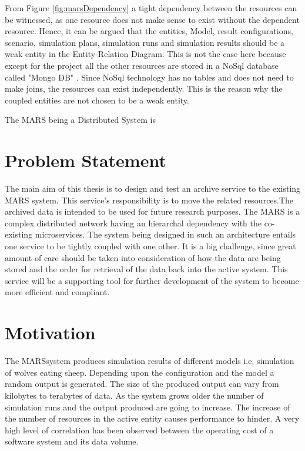         From Figure \ref{fig:marsDependency} a tight dependency between the resources can be witnessed,  
        as one resource does not make sense to exist without the dependent resource. 
        Hence, it can be argued that the entities, Model, result configurations, scenario, simulation plans, 
        simulation runs and simulation results should be a weak entity in the Entity-Relation Diagram. This is not
        the case here because except for the project all the other resources are stored in a NoSql database
        called "Mongo DB" \cite{MongoDB}. Since NoSql technology has no tables and does not need to make joins,
        the resources can exist independently. This is the reason why the coupled entities are not chosen to 
        be a weak entity.

        \newpage
        The MARS being a Distributed System \cite{DistributedSystems} is 

    \section{Problem Statement}

        The main aim of this thesis is to design and test an archive service
        to the existing MARS system. This service's responsibility is to move the related resources.The archived data is intended 
        to be used for future research purposes.
        The MARS is a complex distributed network having an
        hierarchal dependency with the co-existing microservices. The system being designed
        in such an architecture entails one service to be tightly coupled with one other. It is 
        a big challenge, since great amount of care should be taken into consideration of how the 
        data are being stored and the order for retrieval of the data back into the active system.
        This service will be a supporting tool for further development of the system to become more 
        efficient and compliant. 
         
    
    \section{Motivation}
    
        The MARS\footnotemark system produces simulation results of 
        different models i.e. simulation of wolves eating sheep. Depending upon the 
        configuration and the model a random output is generated. The size of the produced
        output can vary from kilobytes to terabytes of data. As the system grows older the 
        number of simulation runs and the output produced are going to increase. The increase
        of the number of resources in the active entity causes performance to hinder. 
        A very high level of correlation has been observed between the operating cost of a software 
        system and its data volume. 
        
